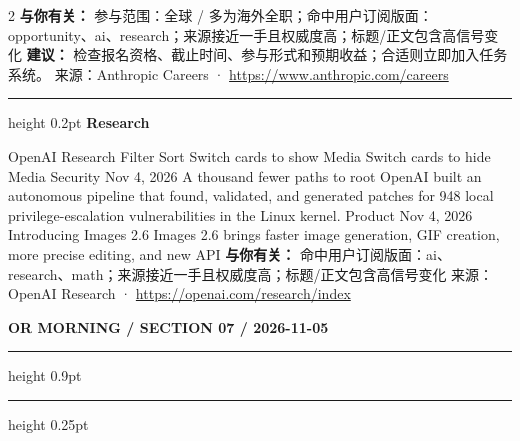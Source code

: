 \documentclass[10.5pt]{ctexart}
\begin{document}
\begin{multicols}{2}
\textbf{与你有关：} 参与范围：全球 / 多为海外全职；命中用户订阅版面：opportunity、ai、research；来源接近一手且权威度高；标题/正文包含高信号变化
\textbf{建议：} 检查报名资格、截止时间、参与形式和预期收益；合适则立即加入任务系统。
{\footnotesize\color{ormuted} 来源：Anthropic Careers · \url{https://www.anthropic.com/careers}}
\vspace{2mm}
\hrule height 0.2pt
\vspace{2mm}
{\large\bfseries Research}\par
OpenAI Research Filter Sort Switch cards to show Media Switch cards to hide Media Security Nov 4, 2026 A thousand fewer paths to root OpenAI built an autonomous pipeline that found, validated, and generated patches for 948 local privilege-escalation vulnerabilities in the Linux kernel. Product Nov 4, 2026 Introducing Images 2.6 Images 2.6 brings faster image generation, GIF creation, more precise editing, and new API
\textbf{与你有关：} 命中用户订阅版面：ai、research、math；来源接近一手且权威度高；标题/正文包含高信号变化
{\footnotesize\color{ormuted} 来源：OpenAI Research · \url{https://openai.com/research/index}}
\end{multicols}
\newpage
{\small\bfseries OR MORNING / SECTION 07 / 2026-11-05}
\vspace{2mm}
\hrule height 0.9pt
\vspace{1.5mm}
\hrule height 0.25pt
\vspace{4mm}
\end{document}

